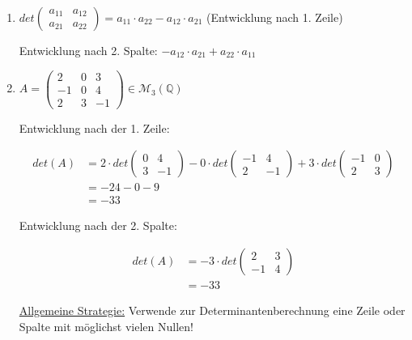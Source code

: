 \documentclass[a4paper, openany]{book}
\begin{document}
        \begin{enumerate}[label=(\alph*)]
          \item $det\begin{pmatrix}a_{11} & a_{12} \\ a_{21} & a_{22} \end{pmatrix} = a_{11} \cdot a_{22} - a_{12} \cdot a_{21}$ (Entwicklung nach 1. Zeile)

          Entwicklung nach 2. Spalte: $-a_{12} \cdot a_{21} + a_{22} \cdot a_{11}$

          \item $A = \begin{pmatrix}2 & 0 & 3 \\ -1 & 0 & 4 \\ 2 & 3 & -1 \end{pmatrix} \in \mathcal{M}_3 (\mathbb{Q})$

          \par \medskip

          Entwicklung nach der 1. Zeile:

          \begin{align*}
            det(A) & = 2 \cdot det \begin{pmatrix}0 & 4 \\ 3 & -1 \end{pmatrix} - 0 \cdot det \begin{pmatrix}-1 & 4  \\ 2 & -1 \end{pmatrix} + 3 \cdot det \begin{pmatrix}-1 & 0 \\ 2 & 3 \end{pmatrix} \\
                   & = -24 - 0 -9 \\
                   & = -33
          \end{align*}

          Entwicklung nach der 2. Spalte:

          \begin{align*}
            det(A)& = -3 \cdot det \begin{pmatrix}2 & 3 \\ -1 & 4 \end{pmatrix} \\
                  & = -33
          \end{align*} 

          \underline{Allgemeine Strategie:} Verwende zur Determinantenberechnung eine Zeile oder Spalte mit möglichst vielen Nullen!


\end{enumerate}
\end{document}
